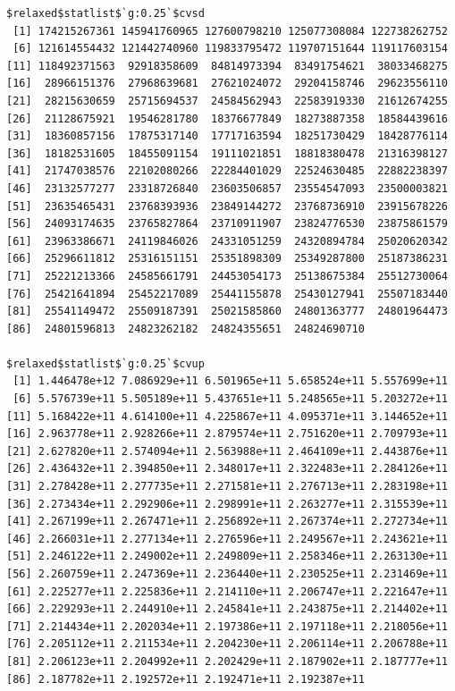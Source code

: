\documentclass[
]{article}
\begin{document}
\begin{verbatim}
$relaxed$statlist$`g:0.25`$cvsd
 [1] 174215267361 145941760965 127600798210 125077308084 122738262752
 [6] 121614554432 121442740960 119833795472 119707151644 119117603154
[11] 118492371563  92918358609  84814973394  83491754621  38033468275
[16]  28966151376  27968639681  27621024072  29204158746  29623556110
[21]  28215630659  25715694537  24584562943  22583919330  21612674255
[26]  21128675921  19546281780  18376677849  18273887358  18584439616
[31]  18360857156  17875317140  17717163594  18251730429  18428776114
[36]  18182531605  18455091154  19111021851  18818380478  21316398127
[41]  21747038576  22102080266  22284401029  22524630485  22882238397
[46]  23132577277  23318726840  23603506857  23554547093  23500003821
[51]  23635465431  23768393936  23849144272  23768736910  23915678226
[56]  24093174635  23765827864  23710911907  23824776530  23875861579
[61]  23963386671  24119846026  24331051259  24320894784  25020620342
[66]  25296611812  25316151151  25351898309  25349287800  25187386231
[71]  25221213366  24585661791  24453054173  25138675384  25512730064
[76]  25421641894  25452217089  25441155878  25430127941  25507183440
[81]  25541149472  25509187391  25021585860  24801363777  24801964473
[86]  24801596813  24823262182  24824355651  24824690710

$relaxed$statlist$`g:0.25`$cvup
 [1] 1.446478e+12 7.086929e+11 6.501965e+11 5.658524e+11 5.557699e+11
 [6] 5.576739e+11 5.505189e+11 5.437651e+11 5.248565e+11 5.203272e+11
[11] 5.168422e+11 4.614100e+11 4.225867e+11 4.095371e+11 3.144652e+11
[16] 2.963778e+11 2.928266e+11 2.879574e+11 2.751620e+11 2.709793e+11
[21] 2.627820e+11 2.574094e+11 2.563988e+11 2.464109e+11 2.443876e+11
[26] 2.436432e+11 2.394850e+11 2.348017e+11 2.322483e+11 2.284126e+11
[31] 2.278428e+11 2.277735e+11 2.271581e+11 2.276713e+11 2.283198e+11
[36] 2.273434e+11 2.292906e+11 2.298991e+11 2.263277e+11 2.315539e+11
[41] 2.267199e+11 2.267471e+11 2.256892e+11 2.267374e+11 2.272734e+11
[46] 2.266031e+11 2.277134e+11 2.276596e+11 2.249567e+11 2.243621e+11
[51] 2.246122e+11 2.249002e+11 2.249809e+11 2.258346e+11 2.263130e+11
[56] 2.260759e+11 2.247369e+11 2.236440e+11 2.230525e+11 2.231469e+11
[61] 2.225277e+11 2.225836e+11 2.214110e+11 2.206747e+11 2.221647e+11
[66] 2.229293e+11 2.244910e+11 2.245841e+11 2.243875e+11 2.214402e+11
[71] 2.214434e+11 2.202034e+11 2.197386e+11 2.197118e+11 2.218056e+11
[76] 2.205112e+11 2.211534e+11 2.204230e+11 2.206114e+11 2.206788e+11
[81] 2.206123e+11 2.204992e+11 2.202429e+11 2.187902e+11 2.187777e+11
[86] 2.187782e+11 2.192572e+11 2.192471e+11 2.192387e+11


\end{verbatim}
\end{document}
